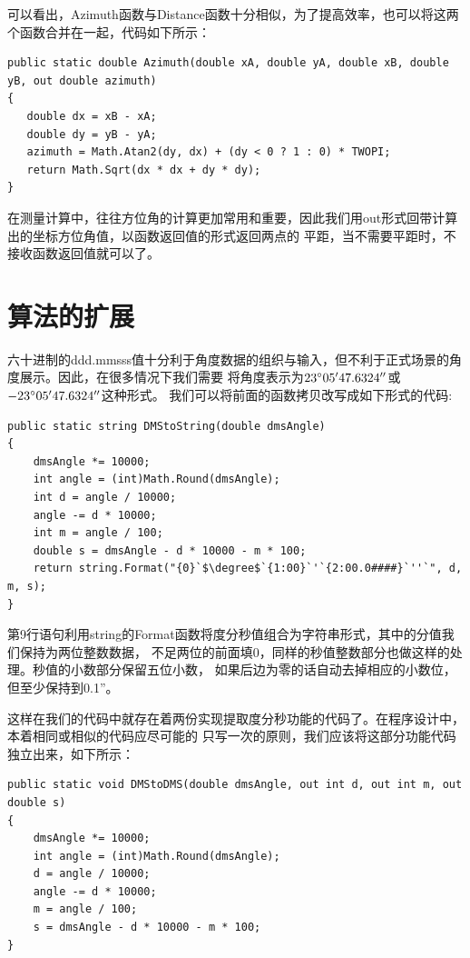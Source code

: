 可以看出，Azimuth函数与Distance函数十分相似，为了提高效率，也可以将这两个函数合并在一起，代码如下所示：

\begin{lstlisting}
public static double Azimuth(double xA, double yA, double xB, double yB, out double azimuth)
{
   double dx = xB - xA;
   double dy = yB - yA;
   azimuth = Math.Atan2(dy, dx) + (dy < 0 ? 1 : 0) * TWOPI;
   return Math.Sqrt(dx * dx + dy * dy);
}
\end{lstlisting}

在测量计算中，往往方位角的计算更加常用和重要，因此我们用out形式回带计算出的坐标方位角值，以函数返回值的形式返回两点的
平距，当不需要平距时，不接收函数返回值就可以了。


\section{算法的扩展}

六十进制的ddd.mmsss值十分利于角度数据的组织与输入，但不利于正式场景的角度展示。因此，在很多情况下我们需要
将角度表示为$23^\circ 05'47.6324''$或$-23^\circ 05'47.6324''$这种形式。
我们可以将前面的函数拷贝改写成如下形式的代码:

\begin{lstlisting}
public static string DMStoString(double dmsAngle)
{
    dmsAngle *= 10000; 
    int angle = (int)Math.Round(dmsAngle);
    int d = angle / 10000;
    angle -= d * 10000;
    int m = angle / 100;
    double s = dmsAngle - d * 10000 - m * 100;
    return string.Format("{0}`$\degree$`{1:00}`'`{2:00.0####}`''`", d, m, s);
}
\end{lstlisting}

第9行语句利用string的Format函数将度分秒值组合为字符串形式，其中的分值我们保持为两位整数数据，
不足两位的前面填0，同样的秒值整数部分也做这样的处理。秒值的小数部分保留五位小数，
如果后边为零的话自动去掉相应的小数位，但至少保持到0.1''。

这样在我们的代码中就存在着两份实现提取度分秒功能的代码了。在程序设计中，本着相同或相似的代码应尽可能的
只写一次的原则，我们应该将这部分功能代码独立出来，如下所示：

\begin{lstlisting}
public static void DMStoDMS(double dmsAngle, out int d, out int m, out double s)
{
    dmsAngle *= 10000; 
    int angle = (int)Math.Round(dmsAngle);
    d = angle / 10000;
    angle -= d * 10000;
    m = angle / 100;
    s = dmsAngle - d * 10000 - m * 100;
}
\end{lstlisting}

